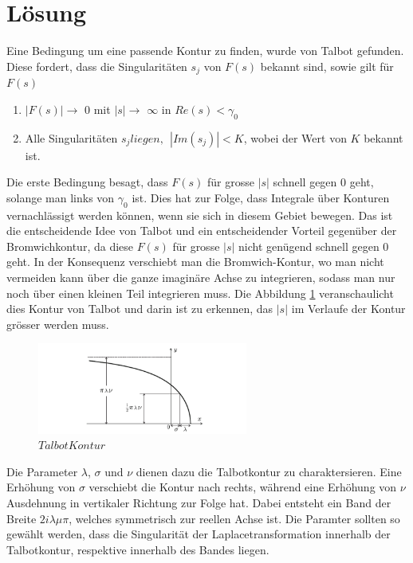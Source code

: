 %
%
%


\section{Lösung}
\label{laplace:section:Methode nach Talbot}
Eine Bedingung um eine passende Kontur zu finden, wurde von Talbot gefunden.
Diese fordert, dass die Singularitäten $s_{j}$ von $F(s)$ bekannt sind, sowie gilt für $F(s)$
\begin{enumerate}
\item
$|F(s)|\rightarrow$ $0$ mit $|s|\rightarrow$ $\infty$ in $Re(s)<\gamma_{0}$
\item
Alle Singularitäten $s_{j} liegen,~~|Im(s_{j})|<K$, wobei der Wert von $K$ bekannt ist.
\end{enumerate}

Die erste Bedingung besagt, dass $F(s)$ für grosse $|s|$ schnell gegen $0$ geht, solange man links von $\gamma_{0}$ ist. Dies hat zur Folge, dass Integrale über Konturen vernachlässigt werden können, wenn sie sich in diesem Gebiet bewegen. Das ist die entscheidende Idee von Talbot und ein entscheidender Vorteil gegenüber der Bromwichkontur, da diese $F(s)$ für grosse $|s|$ nicht genügend schnell gegen $0$ geht. In der Konsequenz verschiebt man die Bromwich-Kontur, wo man nicht vermeiden kann über die ganze imaginäre Achse zu integrieren, sodass man nur noch über einen kleinen Teil integrieren muss. Die Abbildung \ref{laplace:talbotkontur} veranschaulicht dies Kontur von Talbot und darin ist zu erkennen, das  $|s|$ im Verlaufe der Kontur grösser werden muss.

\begin{figure}
\centering
\includegraphics[width=6.9cm]{papers/laplace/Talbot_Contour.png}
\caption{$Talbot Kontur$}
\label{laplace:talbotkontur}
\end{figure}

Die Parameter $\lambda$, $\sigma$ und $\nu$ dienen dazu die
Talbotkontur zu charaktersieren. Eine Erhöhung von $\sigma$ verschiebt
die Kontur nach rechts, während eine Erhöhung von $\nu$ Ausdehnung
in vertikaler Richtung zur Folge hat. Dabei entsteht ein Band der Breite $2i\lambda\mu\pi$, welches symmetrisch zur reellen Achse ist. Die Paramter sollten so gewählt werden, dass die Singularität der Laplacetransformation innerhalb der Talbotkontur, respektive innerhalb des Bandes liegen. 


